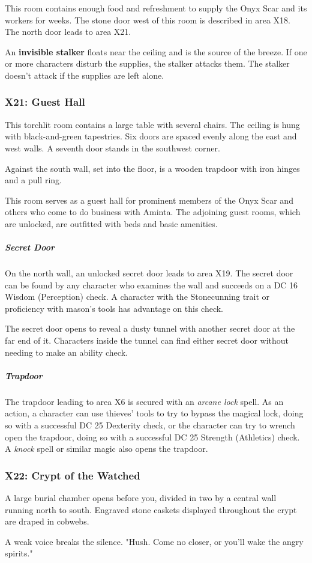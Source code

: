 \documentclass[10pt,a4paper,twoside,bg=print,twocolumn,openany,nodeprecatedcode]{dndbook}
\begin{document}
This room contains enough food and refreshment to supply the Onyx Scar and its workers for weeks. The stone door west of this room is described in area X18. The north door leads to area X21.

An \textbf{invisible stalker} floats near the ceiling and is the source of the breeze. If one or more characters disturb the supplies, the stalker attacks them. The stalker doesn't attack if the supplies are left alone.

\subsubsection{X21: Guest Hall}
\begin{DndReadAloud}{}
This torchlit room contains a large table with several chairs. The ceiling is hung with black-and-green tapestries. Six doors are spaced evenly along the east and west walls. A seventh door stands in the southwest corner.

Against the south wall, set into the floor, is a wooden trapdoor with iron hinges and a pull ring.

\end{DndReadAloud}

This room serves as a guest hall for prominent members of the Onyx Scar and others who come to do business with Aminta. The adjoining guest rooms, which are unlocked, are outfitted with beds and basic amenities.

\subparagraph{Secret Door}
On the north wall, an unlocked secret door leads to area X19. The secret door can be found by any character who examines the wall and succeeds on a DC 16 Wisdom (Perception) check. A character with the Stonecunning trait or proficiency with mason's tools has advantage on this check.

The secret door opens to reveal a dusty tunnel with another secret door at the far end of it. Characters inside the tunnel can find either secret door without needing to make an ability check.

\subparagraph{Trapdoor}
The trapdoor leading to area X6 is secured with an \textit{arcane lock} spell. As an action, a character can use thieves' tools to try to bypass the magical lock, doing so with a successful DC 25 Dexterity check, or the character can try to wrench open the trapdoor, doing so with a successful DC 25 Strength (Athletics) check. A \textit{knock} spell or similar magic also opens the trapdoor.

\subsubsection{X22: Crypt of the Watched}
\begin{DndReadAloud}{}
A large burial chamber opens before you, divided in two by a central wall running north to south. Engraved stone caskets displayed throughout the crypt are draped in cobwebs.

A weak voice breaks the silence. "Hush. Come no closer, or you'll wake the angry spirits."

\end{DndReadAloud}
\end{document}

